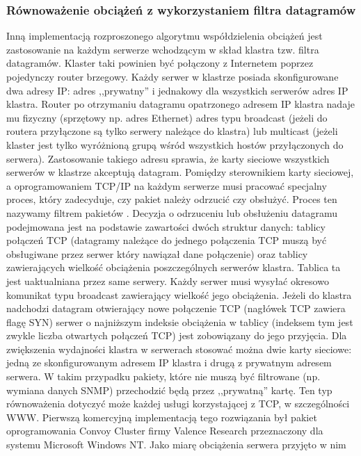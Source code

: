 \subsubsection{Równoważenie obciążeń z wykorzystaniem filtra datagramów}

Inną implementacją rozproszonego algorytmu współdzielenia obciążeń jest zastosowanie na każdym serwerze 
wchodzącym w skład klastra tzw. filtra datagramów. Klaster taki powinien być połączony z Internetem poprzez 
pojedynczy router brzegowy. Każdy serwer w klastrze posiada skonfigurowane dwa adresy IP: adres ,,prywatny'' i 
jednakowy dla wszystkich serwerów adres IP klastra. Router po otrzymaniu datagramu opatrzonego adresem IP 
klastra nadaje mu fizyczny (sprzętowy np. adres Ethernet) adres typu broadcast (jeżeli do routera przyłączone 
są tylko serwery należące do klastra) lub multicast (jeżeli klaster jest tylko wyróżnioną grupą wśród 
wszystkich hostów przyłączonych do serwera). Zastosowanie takiego adresu sprawia, że karty sieciowe wszystkich 
serwerów w klastrze akceptują datagram. Pomiędzy sterownikiem karty sieciowej, a oprogramowaniem TCP/IP na 
każdym serwerze musi pracować specjalny proces, który zadecyduje, czy pakiet należy odrzucić czy obsłużyć. 
Proces ten nazywamy filtrem pakietów \cite{barylo34}. Decyzja o odrzuceniu lub obsłużeniu datagramu podejmowana jest na 
podstawie zawartości dwóch struktur danych: tablicy połączeń TCP (datagramy należące do jednego połączenia 
TCP muszą być obsługiwane przez serwer który nawiązał dane połączenie) oraz tablicy zawierających wielkość 
obciążenia poszczególnych serwerów klastra. Tablica ta jest uaktualniana przez same serwery. Każdy serwer musi 
wysyłać okresowo komunikat typu broadcast zawierający wielkość jego obciążenia. Jeżeli do klastra nadchodzi 
datagram otwierający nowe połączenie TCP (nagłówek TCP zawiera flagę SYN) serwer o najniższym indeksie 
obciążenia w tablicy (indeksem tym jest zwykle liczba otwartych połączeń TCP) jest zobowiązany do jego 
przyjęcia. Dla zwiększenia wydajności klastra w serwerach stosować można dwie karty sieciowe: jedną ze 
skonfigurowanym adresem IP klastra i drugą z prywatnym adresem serwera.  W takim przypadku pakiety, które nie 
muszą być filtrowane (np. wymiana danych SNMP) przechodzić będą przez  ,,prywatną'' kartę. Ten typ równoważenia 
dotyczyć może każdej usługi korzystającej z TCP, w szczególności WWW.
Pierwszą komercyjną implementacją tego rozwiązania był pakiet oprogramowania Convoy Cluster firmy 
Valence Research przeznaczony dla systemu Microsoft Windows NT. Jako miarę obciążenia serwera przyjęto w nim 
